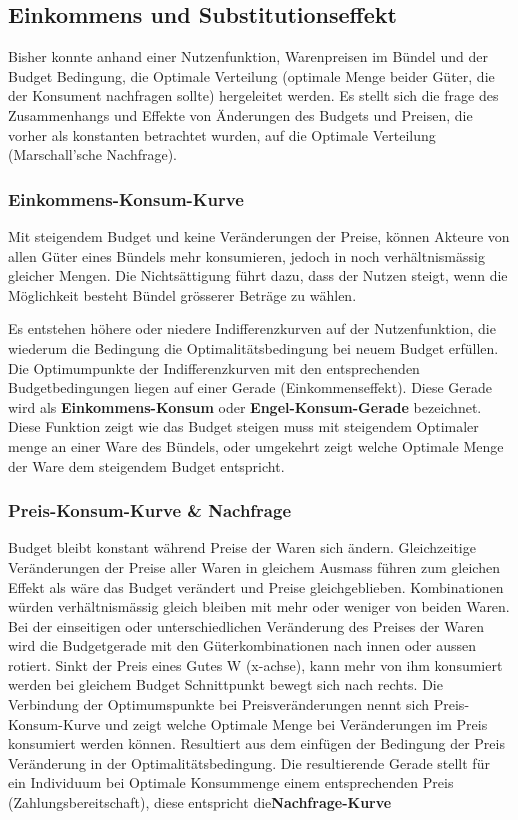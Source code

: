 
\subsection{Einkommens und Substitutionseffekt}
Bisher konnte anhand einer Nutzenfunktion, Warenpreisen im Bündel und der Budget Bedingung, die Optimale Verteilung (optimale Menge beider Güter, die der Konsument nachfragen sollte) hergeleitet werden.
Es stellt sich die frage des Zusammenhangs und Effekte von Änderungen des Budgets und Preisen, die vorher als konstanten betrachtet wurden, auf die Optimale Verteilung (Marschall'sche Nachfrage).

\subsubsection{Einkommens-Konsum-Kurve}
Mit steigendem Budget und keine Veränderungen der Preise, können Akteure von allen Güter eines Bündels mehr konsumieren, jedoch in noch verhältnismässig gleicher Mengen. Die Nichtsättigung führt dazu, dass der Nutzen steigt, wenn die Möglichkeit besteht Bündel grösserer Beträge zu wählen.

Es entstehen höhere oder niedere Indifferenzkurven auf der Nutzenfunktion, die wiederum die Bedingung die Optimalitätsbedingung bei neuem Budget erfüllen. Die Optimumpunkte der Indifferenzkurven mit den entsprechenden Budgetbedingungen liegen auf einer Gerade (Einkommenseffekt). Diese Gerade wird als \textbf{Einkommens-Konsum} oder \textbf{Engel-Konsum-Gerade} bezeichnet. Diese Funktion zeigt wie das Budget steigen muss mit steigendem Optimaler menge an einer Ware des Bündels, oder umgekehrt zeigt welche Optimale Menge der Ware dem steigendem Budget entspricht.


\subsubsection{Preis-Konsum-Kurve \& Nachfrage}
Budget bleibt konstant während Preise der Waren sich ändern. Gleichzeitige Veränderungen der Preise aller Waren in gleichem Ausmass führen zum gleichen Effekt als wäre das Budget verändert und Preise gleichgeblieben. Kombinationen würden verhältnismässig gleich bleiben mit mehr oder weniger von beiden Waren.
Bei der einseitigen oder unterschiedlichen Veränderung des Preises der Waren wird die Budgetgerade mit den Güterkombinationen nach innen oder aussen rotiert. Sinkt der Preis eines Gutes W (x-achse), kann mehr von ihm konsumiert werden bei gleichem Budget Schnittpunkt bewegt sich nach rechts.
Die Verbindung der Optimumspunkte bei Preisveränderungen nennt sich Preis-Konsum-Kurve und zeigt welche Optimale Menge bei Veränderungen im Preis konsumiert werden können.
Resultiert aus dem einfügen der Bedingung der Preis Veränderung in der Optimalitätsbedingung.
Die resultierende Gerade stellt für ein Individuum bei Optimale Konsummenge einem entsprechenden Preis (Zahlungsbereitschaft), diese entspricht die\textbf{Nachfrage-Kurve}

